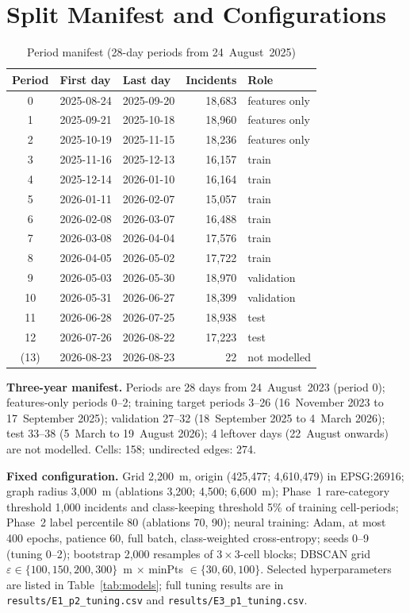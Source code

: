 \documentclass[11pt,a4paper]{report}
\begin{document}
\chapter{Split Manifest and Configurations}
\label{app:split}
\begin{table}[H]
\centering\small
\caption{Period manifest (28-day periods from 24~August~2025)}
\label{tab:periods}
\begin{tabular}{@{}cllrl@{}}
\toprule
Period & First day & Last day & Incidents & Role\\
\midrule
0 & 2025-08-24 & 2025-09-20 & 18,683 & features only\\
1 & 2025-09-21 & 2025-10-18 & 18,960 & features only\\
2 & 2025-10-19 & 2025-11-15 & 18,236 & features only\\
3 & 2025-11-16 & 2025-12-13 & 16,157 & train\\
4 & 2025-12-14 & 2026-01-10 & 16,164 & train\\
5 & 2026-01-11 & 2026-02-07 & 15,057 & train\\
6 & 2026-02-08 & 2026-03-07 & 16,488 & train\\
7 & 2026-03-08 & 2026-04-04 & 17,576 & train\\
8 & 2026-04-05 & 2026-05-02 & 17,722 & train\\
9 & 2026-05-03 & 2026-05-30 & 18,970 & validation\\
10 & 2026-05-31 & 2026-06-27 & 18,399 & validation\\
11 & 2026-06-28 & 2026-07-25 & 18,938 & test\\
12 & 2026-07-26 & 2026-08-22 & 17,223 & test\\
(13) & 2026-08-23 & 2026-08-23 & 22 & not modelled\\
\bottomrule
\end{tabular}
\end{table}

\noindent\textbf{Three-year manifest.} Periods are 28 days from 24~August~2023 (period 0); features-only periods 0--2; training target periods 3--26 (16~November 2023 to 17~September 2025); validation 27--32 (18~September 2025 to 4~March 2026); test 33--38 (5~March to 19~August 2026); 4 leftover days (22~August onwards) are not modelled. Cells: 158; undirected edges: 274.\par\medskip
\noindent\textbf{Fixed configuration.} Grid 2,200~m, origin (425,477; 4,610,479) in EPSG:26916; graph radius 3,000~m (ablations 3,200; 4,500; 6,600~m); Phase~1 rare-category threshold 1,000 incidents and class-keeping threshold 5\% of training cell-periods; Phase~2 label percentile 80 (ablations 70, 90); neural training: Adam, at most 400 epochs, patience 60, full batch, class-weighted cross-entropy; seeds 0--9 (tuning 0--2); bootstrap 2,000 resamples of $3\times3$-cell blocks; DBSCAN grid $\varepsilon\in\{100,150,200,300\}$~m $\times$ minPts $\in\{30,60,100\}$. Selected hyperparameters are listed in Table~\ref{tab:models}; full tuning results are in \texttt{results/E1\_p2\_tuning.csv} and \texttt{results/E3\_p1\_tuning.csv}.
\end{document}
